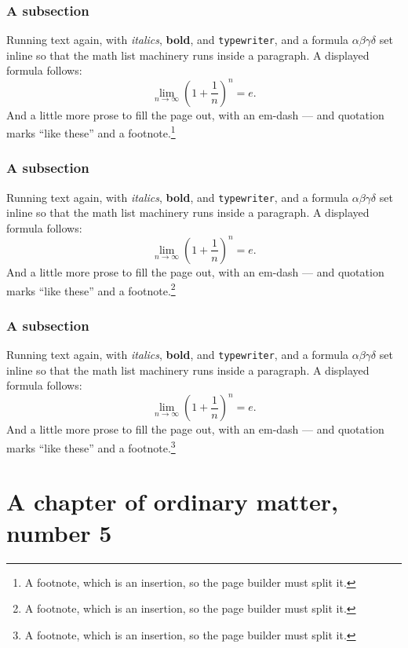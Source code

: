 \documentclass[11pt,a4paper]{report}
\theoremstyle{plain}
\begin{document}
\subsection{A subsection}
Running text again, with \textit{italics}, \textbf{bold}, and
\texttt{typewriter}, and a formula $\alpha\beta\gamma\delta$ set inline so
that the math list machinery runs inside a paragraph. A displayed formula
follows:
\[ \lim_{n\to\infty}\left(1+\frac{1}{n}\right)^{n}=e . \]
And a little more prose to fill the page out, with an em-dash --- and
quotation marks ``like these'' and a footnote.\footnote{A footnote, which is
an insertion, so the page builder must split it.}
\subsection{A subsection}
Running text again, with \textit{italics}, \textbf{bold}, and
\texttt{typewriter}, and a formula $\alpha\beta\gamma\delta$ set inline so
that the math list machinery runs inside a paragraph. A displayed formula
follows:
\[ \lim_{n\to\infty}\left(1+\frac{1}{n}\right)^{n}=e . \]
And a little more prose to fill the page out, with an em-dash --- and
quotation marks ``like these'' and a footnote.\footnote{A footnote, which is
an insertion, so the page builder must split it.}
\subsection{A subsection}
Running text again, with \textit{italics}, \textbf{bold}, and
\texttt{typewriter}, and a formula $\alpha\beta\gamma\delta$ set inline so
that the math list machinery runs inside a paragraph. A displayed formula
follows:
\[ \lim_{n\to\infty}\left(1+\frac{1}{n}\right)^{n}=e . \]
And a little more prose to fill the page out, with an em-dash --- and
quotation marks ``like these'' and a footnote.\footnote{A footnote, which is
an insertion, so the page builder must split it.}
\chapter{A chapter of ordinary matter, number 5}
\end{document}
